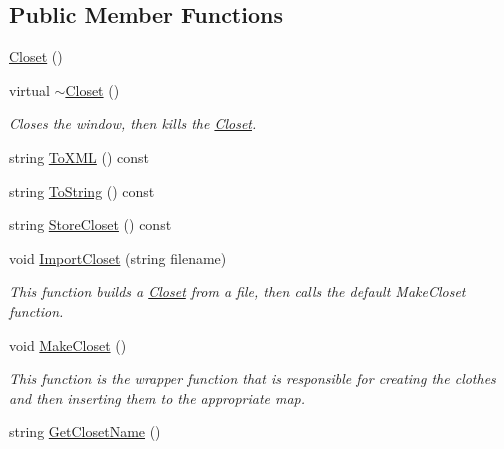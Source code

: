\subsection*{Public Member Functions}
\begin{DoxyCompactItemize}
\item 
\mbox{\hyperlink{classCloset_a42a132f9c1f9fe46976dea604f23055c}{Closet}} ()
\item 
virtual \mbox{\hyperlink{classCloset_a5afebda9b625af231a1d980ff851b2a3}{$\sim$\+Closet}} ()
\begin{DoxyCompactList}\small\item\em Closes the window, then kills the \mbox{\hyperlink{classCloset}{Closet}}. \end{DoxyCompactList}\item 
string \mbox{\hyperlink{classCloset_a7642f749dfd4ad11a83c2cab5a3bdae2}{To\+X\+ML}} () const
\item 
string \mbox{\hyperlink{classCloset_a3bad65dd75ada9a484eb7f78ebfa3b2a}{To\+String}} () const
\item 
string \mbox{\hyperlink{classCloset_a1f2ec8e3e912756e35fdc55c9401ea3e}{Store\+Closet}} () const
\item 
void \mbox{\hyperlink{classCloset_ac1057604430a855ca081cbfe16af10a5}{Import\+Closet}} (string filename)
\begin{DoxyCompactList}\small\item\em This function builds a \mbox{\hyperlink{classCloset}{Closet}} from a file, then calls the default \textquotesingle{}Make\+Closet\textquotesingle{} function. \end{DoxyCompactList}\item 
void \mbox{\hyperlink{classCloset_a1b904dfcdafe293f3f530b338afc0601}{Make\+Closet}} ()
\begin{DoxyCompactList}\small\item\em This function is the wrapper function that is responsible for creating the clothes and then inserting them to the appropriate map. \end{DoxyCompactList}\item 
string \mbox{\hyperlink{classCloset_a108ab29dacfccd5d1c958d5ec88ad64f}{Get\+Closet\+Name}} ()
\end{DoxyCompactItemize}
